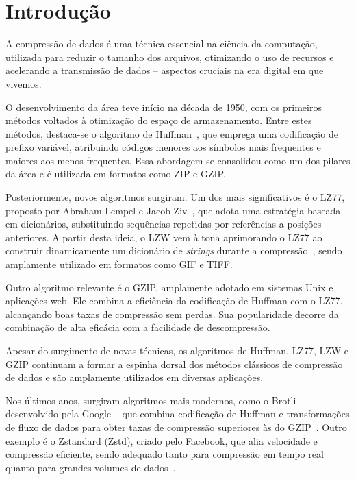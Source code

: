 \chapter{Introdução}
\label{c.introducao}

  A compressão de dados é uma técnica essencial na ciência da computação, utilizada para reduzir o tamanho dos arquivos,
  otimizando o uso de recursos e acelerando a transmissão de dados -- aspectos cruciais na era digital em que vivemos.

  O desenvolvimento da área teve início na década de 1950, com os primeiros métodos voltados à otimização do espaço de
  armazenamento. Entre estes métodos, destaca-se o algoritmo de Huffman~\cite{huffman1952method}, que
  emprega uma codificação de prefixo variável, atribuindo códigos menores aos símbolos mais frequentes e maiores aos
  menos frequentes. Essa abordagem se consolidou como um dos pilares da área e é utilizada em formatos como ZIP e GZIP.

  Posteriormente, novos algoritmos surgiram. Um dos mais significativos é o LZ77, proposto por Abraham Lempel e
  Jacob Ziv~\cite{ziv1977universal}, que adota uma estratégia baseada em dicionários, substituindo sequências repetidas
  por referências a posições anteriores. A partir desta ideia, o LZW vem à tona aprimorando o LZ77 ao construir
  dinamicamente um dicionário de \textit{strings} durante a compressão~\cite{welch1984technique}, sendo amplamente
  utilizado em formatos como GIF e TIFF.

  Outro algoritmo relevante é o GZIP, amplamente adotado em sistemas Unix e aplicações web. Ele combina a eficiência da
  codificação de Huffman com o LZ77, alcançando boas taxas de compressão sem perdas. Sua popularidade decorre da
  combinação de alta eficácia com a facilidade de descompressão.

  Apesar do surgimento de novas técnicas, os algoritmos de Huffman, LZ77, LZW e GZIP continuam a formar a espinha dorsal
  dos métodos clássicos de compressão de dados e são amplamente utilizados em diversas aplicações. 

  Nos últimos anos, surgiram algoritmos mais modernos, como o Brotli -- desenvolvido pela Google -- que combina
  codificação de Huffman e transformações de fluxo de dados para obter taxas de compressão superiores às do
  GZIP~\cite{alakuijala2016brotli}. Outro exemplo é o Zstandard (Zstd), criado pelo Facebook, que alia velocidade e
  compressão eficiente, sendo adequado tanto para compressão em tempo real quanto para grandes volumes de
  dados~\cite{collet2016zstandard}.


